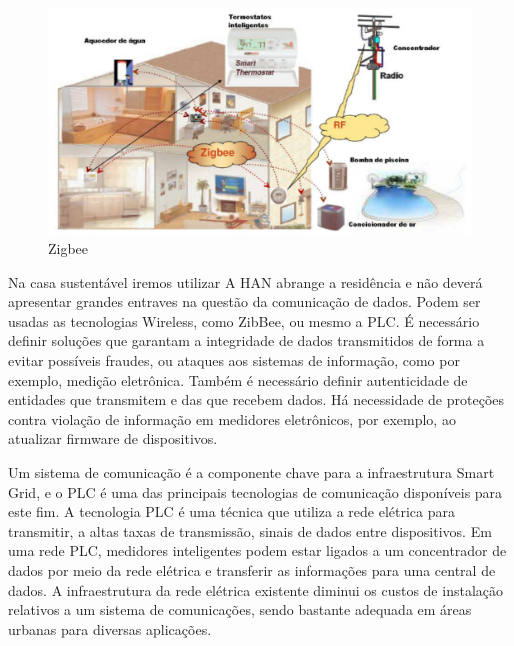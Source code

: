 \begin{figure}[H]
  \begin{center}
	\includegraphics[keepaspectratio]{figuras/zigbee.eps}
	\caption{Zigbee}
  \end{center}
\end{figure}

	Na casa sustentável iremos utilizar A HAN abrange a residência e não deverá apresentar grandes entraves na questão da comunicação de dados. Podem ser usadas as tecnologias Wireless, como ZibBee, ou mesmo a PLC. É necessário definir soluções que garantam a integridade de dados transmitidos de forma a evitar possíveis fraudes, ou ataques aos sistemas de informação, como por exemplo, medição eletrônica. Também é necessário definir autenticidade de entidades que transmitem e das que recebem dados. Há necessidade de proteções contra violação de informação em medidores eletrônicos, por exemplo, ao atualizar firmware de dispositivos\cite{2013Atmel}\cite{2013RiveraEspositoTeixeira}.

	Um sistema de comunicação é a componente chave para a infraestrutura Smart Grid, e o PLC é uma das principais tecnologias de comunicação disponíveis para este fim. A tecnologia PLC é uma técnica que utiliza a rede elétrica para transmitir, a altas taxas de transmissão, sinais de dados entre dispositivos. Em uma rede PLC, medidores inteligentes podem estar ligados a um concentrador de dados por meio da rede elétrica e transferir as informações para uma central de dados. A infraestrutura da rede elétrica existente diminui os custos de instalação relativos a um sistema de comunicações, sendo bastante adequada em áreas urbanas para diversas aplicações.

